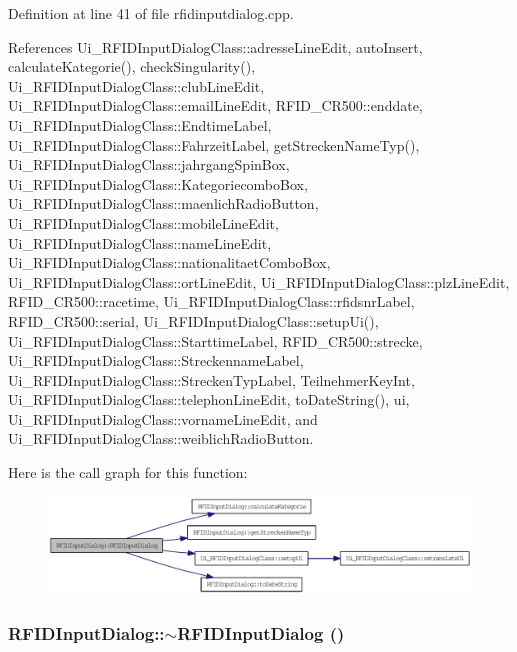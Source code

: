 Definition at line 41 of file rfidinputdialog.cpp.

References Ui\_\-RFIDInputDialogClass::adresseLineEdit, autoInsert, calculateKategorie(), checkSingularity(), Ui\_\-RFIDInputDialogClass::clubLineEdit, Ui\_\-RFIDInputDialogClass::emailLineEdit, RFID\_\-CR500::enddate, Ui\_\-RFIDInputDialogClass::EndtimeLabel, Ui\_\-RFIDInputDialogClass::FahrzeitLabel, getStreckenNameTyp(), Ui\_\-RFIDInputDialogClass::jahrgangSpinBox, Ui\_\-RFIDInputDialogClass::KategoriecomboBox, Ui\_\-RFIDInputDialogClass::maenlichRadioButton, Ui\_\-RFIDInputDialogClass::mobileLineEdit, Ui\_\-RFIDInputDialogClass::nameLineEdit, Ui\_\-RFIDInputDialogClass::nationalitaetComboBox, Ui\_\-RFIDInputDialogClass::ortLineEdit, Ui\_\-RFIDInputDialogClass::plzLineEdit, RFID\_\-CR500::racetime, Ui\_\-RFIDInputDialogClass::rfidsnrLabel, RFID\_\-CR500::serial, Ui\_\-RFIDInputDialogClass::setupUi(), Ui\_\-RFIDInputDialogClass::StarttimeLabel, RFID\_\-CR500::strecke, Ui\_\-RFIDInputDialogClass::StreckennameLabel, Ui\_\-RFIDInputDialogClass::StreckenTypLabel, TeilnehmerKeyInt, Ui\_\-RFIDInputDialogClass::telephonLineEdit, toDateString(), ui, Ui\_\-RFIDInputDialogClass::vornameLineEdit, and Ui\_\-RFIDInputDialogClass::weiblichRadioButton.

Here is the call graph for this function:\nopagebreak
\begin{figure}[H]
\begin{center}
\leavevmode
\includegraphics[width=325pt]{class_r_f_i_d_input_dialog_cf018ae029903a460da1d2e8a6b4ab01_cgraph}
\end{center}
\end{figure}
\hypertarget{class_r_f_i_d_input_dialog_59bcd5df12daee4281cdfbe451e11853}{
\subsubsection[$\sim$RFIDInputDialog]{\setlength{\rightskip}{0pt plus 5cm}RFIDInputDialog::$\sim$RFIDInputDialog ()}}
\label{class_r_f_i_d_input_dialog_59bcd5df12daee4281cdfbe451e11853}


